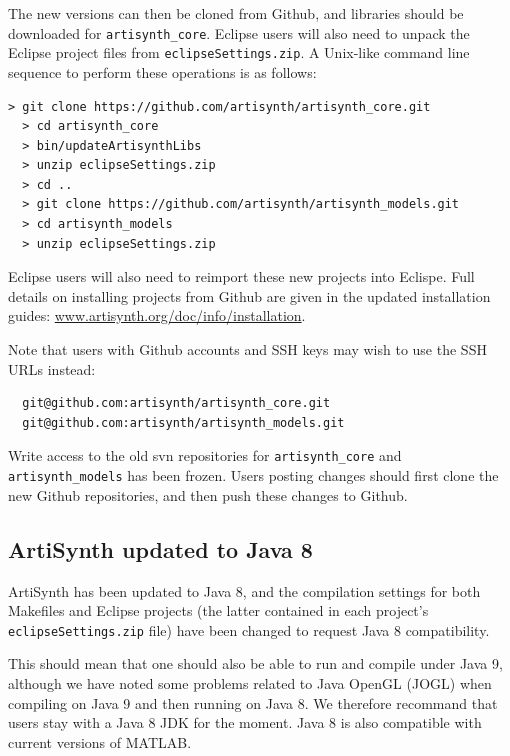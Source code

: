 \documentclass{article}
\begin{document}
The new versions can then be cloned from Github, and libraries should
be downloaded for {\tt artisynth\_core}. Eclipse users will also need
to unpack the Eclipse project files from {\tt eclipseSettings.zip}.
A Unix-like command line sequence to perform these operations
is as follows:
%
\begin{lstlisting}[]
  > git clone https://github.com/artisynth/artisynth_core.git 
  > cd artisynth_core
  > bin/updateArtisynthLibs
  > unzip eclipseSettings.zip
  > cd ..
  > git clone https://github.com/artisynth/artisynth_models.git 
  > cd artisynth_models
  > unzip eclipseSettings.zip
\end{lstlisting}
%
Eclipse users will also need to reimport these new projects into
Eclispe. Full details on installing projects from Github are given in
the updated installation guides:
\href{http://www.artisynth.org/doc/info/installation}%
{www.artisynth.org/doc/info/installation}.

\begin{sideblock}
Note that users with Github accounts and SSH keys may wish to use the
SSH URLs instead:
%
\begin{verbatim}
  git@github.com:artisynth/artisynth_core.git
  git@github.com:artisynth/artisynth_models.git
\end{verbatim}
%
\end{sideblock}

\begin{sideblock}
Write access to the old svn repositories for {\tt artisynth\_core} and
{\tt artisynth\_models} has been frozen. Users posting changes should
first clone the new Github repositories, and then push these changes
to Github.
\end{sideblock}

\subsection*{ArtiSynth updated to Java 8}

ArtiSynth has been updated to Java 8, and the compilation settings for
both Makefiles and Eclipse projects (the latter contained in each
project's {\tt eclipseSettings.zip} file) have been changed to request
Java 8 compatibility. 

This should mean that one should also be able to run and compile under
Java 9, although we have noted some problems related to Java OpenGL
(JOGL) when compiling on Java 9 and then running on Java 8.  We
therefore recommand that users stay with a Java 8 JDK for the
moment. Java 8 is also compatible with current versions of MATLAB.
\end{document}
